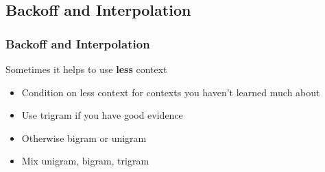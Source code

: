 \documentclass[13.5pt,aspecratio=169]{beamer}
\begin{document}
\subsection{Backoff and Interpolation}
\begin{frame}
    \onehalfspacing
        \frametitle{Backoff and Interpolation}
        {\Large Sometimes it helps to use \textbf{less} context}
        \begin{itemize}
            \item {Condition on less context for contexts you haven’t learned much about}
    
        \end{itemize}
        
        \begin{minipage}{0.5\textwidth}
            \begin{block}{}
                \begin{itemize}
                    \item Use trigram if you have good evidence
                    \item Otherwise bigram or unigram
                \end{itemize}
            \end{block}
        \end{minipage} \hspace{10}
        \begin{minipage}{0.45\textwidth}
            \begin{block}{}
                \begin{itemize}
                    \item Mix unigram, bigram, trigram \\ \vspace{5}
                    \hphantom{fndfjndnjfjnd}
                \end{itemize}
            \end{block}
        \end{minipage}
    
        \bigskip

       
    \end{frame}
\end{document}
